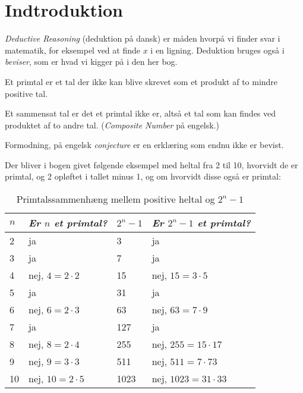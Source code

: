 \chapter{Indtroduktion}

\textit{Deductive Reasoning} (deduktion på dansk) er måden hvorpå vi finder svar i matematik, for eksempel ved at finde $x$ i en ligning. Deduktion bruges også i \textit{beviser}, som er hvad vi kigger på i den her bog.

\begin{definition}[Primtal]
  Et primtal er et tal der ikke kan blive skrevet som et produkt af to mindre positive tal.
\end{definition}

\begin{definition}
Et sammensat tal er det et primtal ikke er, altså et tal som kan findes ved produktet af to andre tal. (\textit{Composite Number} på engelsk.)
\end{definition}

\begin{definition}[Formodning]
Formodning, på engelsk \textit{conjecture} er en erklæring som endnu ikke er bevist.
\end{definition}

Der bliver i bogen givet følgende eksempel med heltal fra 2 til 10, hvorvidt de er primtal, og 2 opløftet i tallet minus 1, og om hvorvidt disse også er primtal:

\begin{table}[]
\centering
\begin{tabular}{llll}
\textit{$n$} & \textit{Er $n$ et primtal?} & \textit{$2^n-1$} & \textit{Er $2^n-1$ et primtal?} \\ \hline
2            & ja                          & 3                & ja                              \\
3            & ja                          & 7                & ja                              \\
4            & nej, $4 = 2 \cdot 2$        & 15               & nej, $15 = 3 \cdot 5$           \\
5            & ja                          & 31               & ja                              \\
6            & nej, $6 = 2 \cdot 3$        & 63               & nej, $63 = 7 \cdot 9$           \\
7            & ja                          & 127              & ja                              \\
8            & nej, $8 = 2 \cdot 4$        & 255              & nej, $255 = 15 \cdot 17$        \\
9            & nej, $9 = 3 \cdot 3$        & 511              & nej, $511 = 7 \cdot 73$         \\
10           & nej, $10 = 2 \cdot 5$       & 1023             & nej, $1023 = 31 \cdot 33$
\end{tabular}
  \caption{\label{fig:primtal2n} Primtalssammenhæng mellem positive heltal og $2^{n}-1$}
\end{table}

